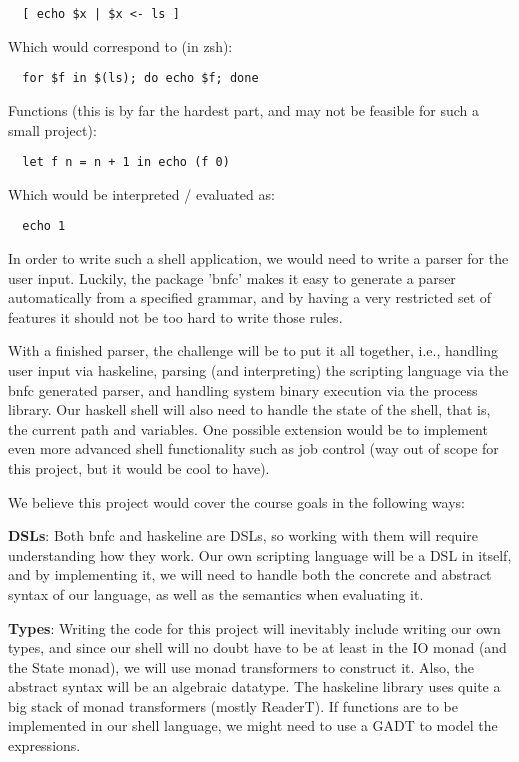\documentclass[11pt,a4paper]{article}
\begin{document}
\begin{verbatim}
  [ echo $x | $x <- ls ]
\end{verbatim}

Which would correspond to (in zsh):

\begin{verbatim}
  for $f in $(ls); do echo $f; done
\end{verbatim}

Functions (this is by far the hardest part, and may not be feasible for such a small project):

\begin{verbatim}
  let f n = n + 1 in echo (f 0)
\end{verbatim}

Which would be interpreted / evaluated as:

\begin{verbatim}
  echo 1
\end{verbatim}

In order to write such a shell application, we would need to write a parser for
the user input. Luckily, the package 'bnfc' makes it easy to generate a parser
automatically from a specified grammar, and by having a very restricted set of
features it should not be too hard to write those rules.

With a finished parser, the challenge will be to put it all together, i.e.,
handling user input via haskeline, parsing (and interpreting) the scripting
language via the bnfc generated parser, and handling system binary execution via
the process library. Our haskell shell will also need to handle the state of the
shell, that is, the current path and variables. One possible extension would be
to implement even more advanced shell functionality such as job control (way out
of scope for this project, but it would be cool to have).


We believe this project would cover the course goals in the following ways:

\textbf{DSLs}: Both bnfc and haskeline are DSLs, so working with them will require
understanding how they work. Our own scripting language will be a DSL in itself,
and by implementing it, we will need to handle both the concrete and abstract
syntax of our language, as well as the semantics when evaluating it.

\textbf{Types}: Writing the code for this project will inevitably include writing our own
types, and since our shell will no doubt have to be at least in the IO monad
(and the State monad), we will use monad transformers to construct it. Also, the
abstract syntax will be an algebraic datatype.  The haskeline library uses quite
a big stack of monad transformers (mostly ReaderT). If functions are to be
implemented in our shell language, we might need to use a GADT to model the
expressions.
\end{document}
